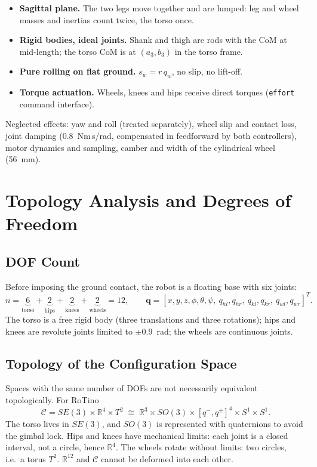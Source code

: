 \documentclass[11pt,a4paper]{article}
\newcommand{\bq}{\bm{q}}
\newcommand{\Real}{\mathbb{R}}
\begin{document}
\begin{itemize}[leftmargin=*]
    \item \textbf{Sagittal plane.}  The two legs move together and are lumped: leg and wheel
          masses and inertias count twice, the torso once.
    \item \textbf{Rigid bodies, ideal joints.}  Shank and thigh are rods with the CoM at
          mid-length; the torso CoM is at $(a_3, b_3)$ in the torso frame.
    \item \textbf{Pure rolling on flat ground.}  $s_w = r\,q_w$, no slip, no lift-off.
    \item \textbf{Torque actuation.}  Wheels, knees and hips receive direct torques
          (\texttt{effort} command interface).
\end{itemize}
Neglected effects: yaw and roll (treated separately), wheel slip and contact loss, joint
damping (0.8~Nm\,s/rad, compensated in feedforward by both controllers), motor dynamics and
sampling, camber and width of the cylindrical wheel (56~mm).


\section{Topology Analysis and Degrees of Freedom}
\label{sec:topology}

\subsection{DOF Count}

Before imposing the ground contact, the robot is a floating base with six joints:
\begin{equation}
    n = \underbrace{6}_{\text{torso}} + \underbrace{2}_{\text{hips}} + \underbrace{2}_{\text{knees}}
      + \underbrace{2}_{\text{wheels}} = 12,
    \qquad
    \bq = [x, y, z, \phi, \theta, \psi,\ q_{hl}, q_{hr},\ q_{kl}, q_{kr},\ q_{wl}, q_{wr}]^T .
\end{equation}
The torso is a free rigid body (three translations and three rotations); hips and knees are
revolute joints limited to $\pm0.9$~rad; the wheels are continuous joints.

\subsection{Topology of the Configuration Space}

Spaces with the same number of DOFs are not necessarily equivalent topologically.  For RoTino
\begin{equation}
    \mathcal{C} = SE(3)\times\Real^4\times T^2
    \;\cong\; \Real^3\times SO(3)\times[q^-,q^+]^4\times S^1\times S^1 .
\end{equation}
The torso lives in $SE(3)$, and $SO(3)$ is represented with quaternions to avoid the gimbal
lock.  Hips and knees have mechanical limits: each joint is a closed interval, not a circle,
hence $\Real^4$.  The wheels rotate without limits: two circles, i.e.\ a torus $T^2$.
$\Real^{12}$ and $\mathcal{C}$ cannot be deformed into each other.
\end{document}
